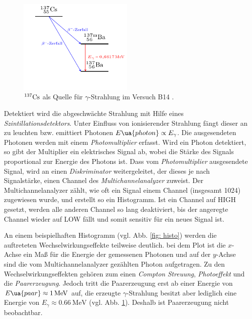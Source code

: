 \begin{figure}[h]
  \centering
  \includegraphics[width=0.5\textwidth]{pics/tikz-Energieschema.pdf}
  \caption{$^{137}\ce{Cs}$ als Quelle für $\gamma$-Strahlung im Versuch B14 \cite{luckyjosh}.}
  \label{fig: zerfall}
\end{figure}

Detektiert wird die abgeschwächte Strahlung mit Hilfe eines \emph{Szintillationsdetektors}.
Unter Einfluss von ionisierender Strahlung fängt dieser an zu leuchten bzw. emittiert Photonen $E\ua{photon}\propto E_\gamma$.
Die ausgesendeten Photonen werden mit einem \emph{Photomultiplier} erfasst. Wird ein Photon detektiert,
so gibt der Multiplier ein elektrisches Signal ab, wobei die Stärke des Signals proportional zur Energie des Photons ist.
Dass vom \emph{Photomultiplier} ausgesendete Signal,
wird an einen \emph{Diskriminator} weitergeleitet, der dieses je nach Signalstärke, einen Channel des
\emph{Multichannelanalyzer} zuweist. Der Multichannelanalyzer zählt, wie oft ein Signal einem Channel (insgesamt 1024) zugewiesen wurde, und
erstellt so ein Histogramm. Ist ein Channel auf HIGH gesetzt, werden alle anderen Channel so lang deaktiviert,
bis der angeregte Channel wieder auf LOW fällt und somit sensitiv für ein neues Signal ist.

An einem beispielhaften Histogramm (vgl. Abb. \ref{fig: histo}) werden die auftreteten Wechselwirkungseffekte teilweise deutlich.
bei dem Plot ist die $x$-Achse ein Maß für die Energie der gemessenen Photonen und auf der $y$-Achse sind die vom Multichannelanalyzer
gezählten Photon aufgetragen.
Zu den Wechselwirkungseffekten gehören zum einen \emph{Compton Streuung}, \emph{Photoeffekt} und die \emph{Paarerzeugung}.
Jedoch tritt die Paarerzeugung erst ab einer Energie von $E\ua{paar}\approx \SI{1}{\mega\eV}$ auf, die erzeugte $\gamma$-Strahlung
besitzt aber lediglich eine Energie von $E_{\gamma}\approx\SI{0.66}{\mega\eV}$ (vgl. Abb. \ref{fig: zerfall}).
Deshalb ist Paarerzeugung nicht beobachtbar.

